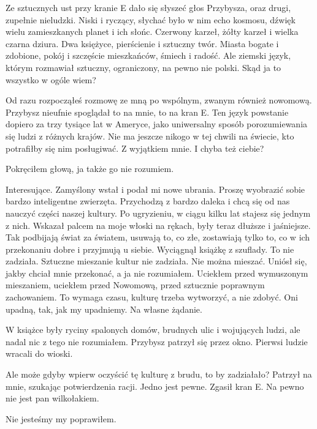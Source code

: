 Ze sztucznych ust przy kranie E dało się słyszeć głos Przybysza, oraz drugi, zupełnie nieludzki.
Niski i ryczący, słychać było w nim echo kosmosu, dźwięk wielu zamieszkanych planet i ich słońc.
Czerwony karzeł, żółty karzeł i wielka czarna dziura. 
Dwa księżyce, pierścienie i sztuczny twór.
Miasta bogate i zdobione, pokój i szczęście mieszkańców, śmiech i radość.
Ale ziemski język, którym rozmawiał sztuczny, ograniczony, na pewno nie polski.
Skąd ja to wszystko w ogóle wiem?

\ds{} Od razu rozpocząłeś rozmowę ze mną po wspólnym, zwanym również nowomową. 
\dm{} Przybysz nieufnie spoglądał to na mnie, to na kran E. 
\dm{} Ten język powstanie dopiero za trzy tysiące lat w Ameryce, jako uniwersalny sposób porozumiewania się ludzi z różnych krajów. Nie ma jeszcze nikogo w tej chwili na świecie, kto potrafiłby się nim posługiwać.
Z wyjątkiem mnie. I chyba też ciebie? \de{}

Pokręciłem głową, ja także go nie rozumiem.

\ds{} Interesujące.
\dm{} Zamyślony wstał i podał mi nowe ubrania.
\dm{} Proszę wyobrazić sobie bardzo inteligentne zwierzęta. 
Przychodzą z bardzo daleka i chcą się od nas nauczyć części naszej kultury.
Po ugryzieniu, w ciągu kilku lat stajesz się jednym z nich. 
\dm{} Wskazał palcem na moje włoski na rękach, były teraz dłuższe i jaśniejsze.
\dm{} Tak podbijają świat za światem, usuwają to, co złe, zostawiają tylko to, co w ich przekonaniu dobre i przyjmują u siebie.
\dm{} Wyciągnął książkę z szuflady.
\dm{} To nie zadziała. Sztuczne mieszanie kultur nie zadziała. Nie można mieszać.
\dm{} Uniósł się, jakby chciał mnie przekonać, a ja nie rozumiałem.
\dm{} Uciekłem przed wymuszonym mieszaniem, uciekłem przed Nowomową, przed sztucznie poprawnym zachowaniem.
To wymaga czasu, kulturę trzeba wytworzyć, a nie zdobyć.
Oni upadną, tak, jak my upadniemy. Na własne żądanie. \de{}

W książce były ryciny spalonych domów, brudnych ulic i wojujących ludzi, ale nadal nic z tego nie rozumiałem.
Przybysz patrzył się przez okno. Pierwsi ludzie wracali do wioski.

\ds{} Ale może gdyby wpierw oczyścić tę kulturę z brudu, to by zadziałało? \dm{} Patrzył na mnie, szukając potwierdzenia racji.
\dm{} Jedno jest pewne. \dm{} Zgasił kran E. \dm{} Na pewno nie jest pan wilkołakiem. \de{}

\ds{} Nie jesteśmy my \dm{} poprawiłem. \de{}













